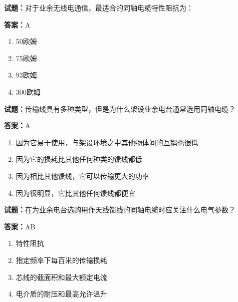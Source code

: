 \documentclass{ctexbook}
\begin{document}



\vspace{1em}

\textbf{试题：}对于业余无线电通信，最适合的同轴电缆特性阻抗为： 

\textbf{答案：}A 

\begin{enumerate}[leftmargin=3em]
  \item 50欧姆 

  \item 75欧姆 

  \item 93欧姆 

  \item 300欧姆 

\end{enumerate}





\vspace{1em}

\textbf{试题：}传输线具有多种类型，但是为什么架设业余电台通常选用同轴电缆？ 

\textbf{答案：}A 

\begin{enumerate}[leftmargin=3em]
  \item 因为它易于使用，与架设环境之中其他物体间的互耦也很低 


  \item 因为它的损耗比其他任何种类的馈线都低 

  \item 因为相比其他馈线，它可以传输更大的功率 

  \item 因为很明显，它比其他任何馈线都便宜 

\end{enumerate}





\vspace{1em}

\textbf{试题：}在为业余电台选购用作天线馈线的同轴电缆时应关注什么电气参数？ 

\textbf{答案：}AB 

\begin{enumerate}[leftmargin=3em]
  \item 特性阻抗 

  \item 指定频率下每百米的传输损耗 

  \item 芯线的截面积和最大额定电流 

  \item 电介质的耐压和最高允许温升 

\end{enumerate}
\end{document}
